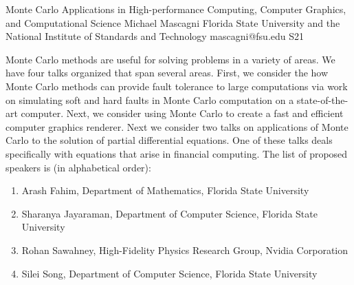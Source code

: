 

\clearpage

\begin{session}
 {Monte Carlo Applications in High-performance Computing, Computer Graphics, and Computational Science}%
 {Michael Mascagni}%
 {Florida State University and the National Institute of Standards and Technology}%
 {mascagni@fsu.edu}%
{}{}{}
 {S21}%
{}

 Monte Carlo methods are useful for solving problems in a variety of areas.  We have four talks organized that span several areas.  First, we consider the how Monte Carlo methods can provide fault tolerance to large computations via work on simulating soft and hard faults in Monte Carlo computation on a state-of-the-art computer.  Next, we consider using Monte Carlo to create a fast and efficient computer graphics renderer. Next we consider two talks on applications of Monte Carlo to the solution of partial differential equations.  One of these talks deals specifically with equations that arise in financial computing.
 The list of proposed speakers is (in alphabetical order):
 \begin{enumerate}
 \item Arash Fahim, Department of Mathematics, Florida State University
 \item Sharanya Jayaraman, Department of Computer Science, Florida State University
 \item Rohan Sawahney, High-Fidelity Physics Research Group, Nvidia Corporation
 \item Silei Song, Department of Computer Science, Florida State University
 \end{enumerate}
 \medskip
\end{session}



\clearpage

